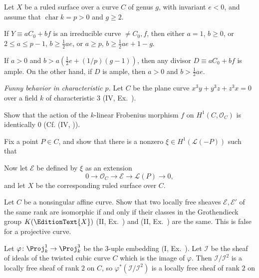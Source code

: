 {{\begin{description}[style=multiline,labelwidth=3em,leftmargin=3.28em,itemsep=3pt,topsep=0pt,parsep=0pt]
\item[\hypertarget{ex-V-2.14}{}2.14.] Let $X$ be a ruled surface over a curve $C$ of genus $g$, with invariant $e<0$, and assume that $\operatorname{char}k=p>0$ and $g\ge2$.
\begin{parts}
\item If $Y\equiv aC_0+bf$ is an irreducible curve $\ne C_0,f$, then either $a=1$, $b\ge0$, or $2\le a\le p-1$, $b\ge\frac12ae$, or $a\ge p$, $b\ge\frac12ae+1-g$.
\item If $a>0$ and $b>a(\frac12e+(1/p)(g-1))$, then any divisor $D\equiv aC_0+bf$ is ample. On the other hand, if $D$ is ample, then $a>0$ and $b>\frac12ae$.
\end{parts}
\item[\hypertarget{ex-V-2.15}{}2.15.] \emph{Funny behavior in characteristic $p$.} Let $C$ be the plane curve $x^3y+y^3z+z^3x=0$ over a field $k$ of characteristic $3$ (IV, Ex.~).
\begin{parts}
\item Show that the action of the $k$-linear Frobenius morphism $f$ on $H^1(C,\mathcal O_C)$ is identically $0$ (Cf. (IV, )).
\item Fix a point $P\in C$, and show that there is a nonzero $\xi\in H^1(\mathcal L(-P))$ such that 
\item Now let $\mathcal E$ be defined by $\xi$ as an extension
\[
0\longrightarrow\mathcal O_C\longrightarrow\mathcal E\longrightarrow\mathcal L(P)\longrightarrow0,
\]
and let $X$ be the corresponding ruled surface over $C$. 
\end{parts}
\item[\hypertarget{ex-V-2.16}{}2.16.] Let $C$ be a nonsingular affine curve. Show that two locally free sheaves $\mathcal E,\mathcal E'$ of the same rank are isomorphic if and only if their classes in the Grothendieck group $K(\EditionText{X})$ (II, Ex.~) and (II, Ex.~) are the same. This is false for a projective curve.
\item[\hypertarget{ex-V-2.17}{}*2.17.]
\begin{parts}
\item\hypertarget{ex-V-2.17a}{} Let $\varphi\colon\Proj_k^1\to\Proj_k^3$ be the 3-uple embedding (I, Ex.~). Let $\mathcal I$ be the sheaf of ideals of the twisted cubic curve $C$ which is the image of $\varphi$. Then $\mathcal I/\mathcal I^2$ is a locally free sheaf of rank $2$ on $C$, so $\varphi^*(\mathcal I/\mathcal I^2)$ is a locally free sheaf of rank $2$ on
\end{parts}
\end{description}
}
}
